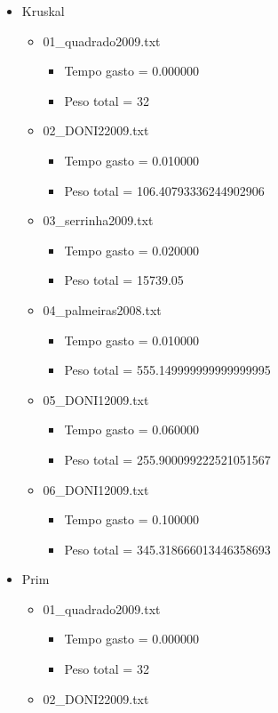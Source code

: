 \documentclass[12pt,a4paper]{article}
\begin{document}
\begin{itemize}
\item Kruskal
\begin{itemize}
\item 01\_quadrado2009.txt
\begin{itemize}
\item Tempo gasto = 0.000000 
\item Peso total = 32
\end{itemize}
\item 02\_DONI22009.txt
\begin{itemize}
\item Tempo gasto = 0.010000 
\item Peso total = 106.40793336244902906 
\end{itemize}
\item 03\_serrinha2009.txt
\begin{itemize}
\item Tempo gasto = 0.020000 
\item Peso total = 15739.05 
\end{itemize}
\item 04\_palmeiras2008.txt
\begin{itemize}
\item Tempo gasto = 0.010000 
\item Peso total = 555.149999999999999995 
\end{itemize}
\item 05\_DONI12009.txt
\begin{itemize}
\item Tempo gasto = 0.060000 
\item Peso total = 255.900099222521051567 
\end{itemize}
\item 06\_DONI12009.txt
\begin{itemize}
\item Tempo gasto = 0.100000 
\item Peso total = 345.318666013446358693 
\end{itemize}
\end{itemize}
\item Prim 
\begin{itemize}
\item 01\_quadrado2009.txt
\begin{itemize}
\item Tempo gasto = 0.000000 
\item Peso total = 32
\end{itemize}
\item 02\_DONI22009.txt

\end{itemize}
\end{itemize}
\end{document}
